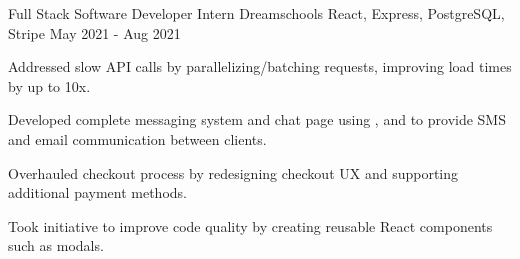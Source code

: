 \begin{cventries}

  \cventry
    {Full Stack Software Developer Intern} %
    {Dreamschools} %
    {React, Express, PostgreSQL, Stripe} %
    {May 2021 - Aug 2021} %
    {
      \begin{cvitems} %
        \item {Addressed slow  API calls by parallelizing/batching requests, improving load times by up to 10x.}
        \item {Developed complete messaging system and chat page using ,  and  to provide SMS and email communication between clients.}
        \item {Overhauled checkout process by redesigning checkout UX and supporting additional payment methods.}
        \item {Took initiative to improve code quality by creating reusable React components such as modals.}
      \end{cvitems}
    }
\end{cventries}
